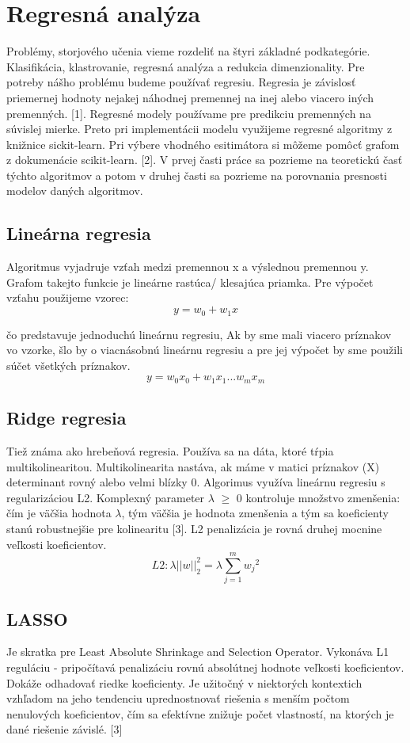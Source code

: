 \section{Regresná analýza}
Problémy, storjového učenia vieme rozdeliť na štyri základné podkategórie. Klasifikácia, klastrovanie, regresná analýza a redukcia dimenzionality. Pre potreby nášho problému budeme používať regresiu. Regresia je závislosť priemernej hodnoty nejakej náhodnej premennej na inej alebo viacero iných premenných. [1]. Regresné modely používame pre predikciu premenných na súvislej mierke.  Preto pri implementácii modelu využijeme regresné algoritmy z knižnice sickit-learn. Pri výbere vhodného esitimátora si môžeme pomôcť grafom z dokumenácie scikit-learn. [2]. V prvej časti práce sa pozrieme na teoretickú časť týchto algoritmov a potom v druhej časti sa pozrieme na porovnania presnosti modelov daných algoritmov.

\subsection{Lineárna regresia}

Algoritmus vyjadruje vzťah medzi premennou x a výslednou premennou y. Grafom takejto funkcie je lineárne rastúca/ klesajúca priamka. Pre výpočet vzťahu použijeme vzorec:
\[ y = w_{0} + w_{1} x \]

čo predstavuje jednoduchú lineárnu regresiu, Ak by sme mali viacero príznakov vo vzorke, šlo by o viacnásobnú lineárnu regresiu a pre jej výpočet by sme použili súčet všetkých príznakov.
\[ y = w_{0} x_{0} + w_{1} x_{1} ... w_{m} x_{m} \]

\subsection{Ridge regresia}
Tiež známa ako hrebeňová regresia. Používa sa na dáta, ktoré tŕpia multikolinearitou. Multikolinearita nastáva, ak máme v matici príznakov (X) determinant rovný alebo velmi blízky 0. Algorimus využíva lineárnu regresiu s regularizáciou L2. Komplexný parameter $\lambda$ $\geq$ 0 kontroluje množstvo zmenšenia: čím je väčšia hodnota $\lambda$, tým väčšia je hodnota zmenšenia a tým sa koeficienty stanú robustnejšie pre kolinearitu [3]. L2 penalizácia je rovná druhej mocnine veľkosti koeficientov.
\[L2: \lambda ||w || _{2}^{2} = \lambda \sum_{j=1}^{m} {w_{j}}^{2} \]

\subsection{LASSO}
Je skratka pre Least Absolute Shrinkage and Selection Operator. Vykonáva L1 reguláciu - pripočítavá penalizáciu rovnú absolútnej hodnote veľkosti koeficientov. Dokáže odhadovať riedke koeficienty. Je užitočný v niektorých kontextich vzhľadom na jeho tendenciu uprednostnovať riešenia s menším počtom nenulových koeficientov, čím sa efektívne znižuje počet vlastností, na ktorých je dané riešenie závislé. [3]

